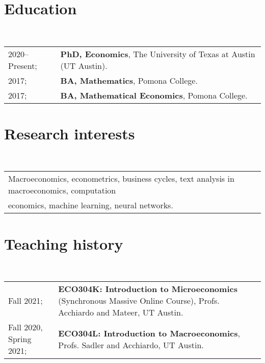 \documentclass[a4paper, 11pt]{article}
\begin{document}
  \maketitle
  \thispagestyle{firststyle}
  \section{Education}
  ~\begin{tabular}{ll}
    2020--Present; & \textbf{PhD, Economics}, The University of Texas at Austin (UT Austin).\\
    2017; & \textbf{BA, Mathematics}, Pomona College.\\
    2017; & \textbf{BA, Mathematical Economics}, Pomona College.\\
  \end{tabular}
  \vspace*{0.25em}

  \section{Research interests}
  ~\begin{tabular}{l}
    Macroeconomics, econometrics, business cycles, text analysis in macroeconomics, computation\\ 
    economics, machine learning, neural networks.
  \end{tabular}
  \vspace*{0.25em}

  \begin{publications}
      \vspace*{-0.75em}
  \end{publications}
  \vspace*{-0.75em}

  \section{Teaching history}
  ~\begin{tabular}{l p{12cm}}
    Fall 2021; & \textbf{ECO304K: Introduction to Microeconomics} (Synchronous Massive Online Course), Profs. Acchiardo and Mateer, UT Austin.\\
    Fall 2020, Spring 2021; & \textbf{ECO304L: Introduction to Macroeconomics}, Profs. Sadler and Acchiardo, UT Austin.\\
  \end{tabular}
  \vspace*{-0.5em}
\end{document}
